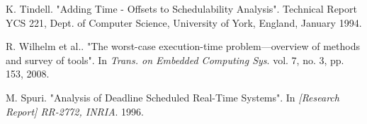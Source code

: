 \documentclass{article}
\begin{document}
\begin{thebibliography}{1}
K. Tindell.
\newblock "Adding Time - Offsets to Schedulability Analysis".
\newblock Technical Report YCS 221, Dept. of Computer Science, University of York, England, January 1994.

R. Wilhelm et al..
\newblock "The worst-case execution-time problem—overview of methods and survey of tools".
\newblock In {\em Trans. on Embedded Computing Sys}. vol. 7, no. 3, pp. 153, 2008.

M. Spuri.
\newblock "Analysis of Deadline Scheduled Real-Time Systems".
\newblock In {\em [Research Report] RR-2772, INRIA}. 1996.

\end{thebibliography}
\end{document}
